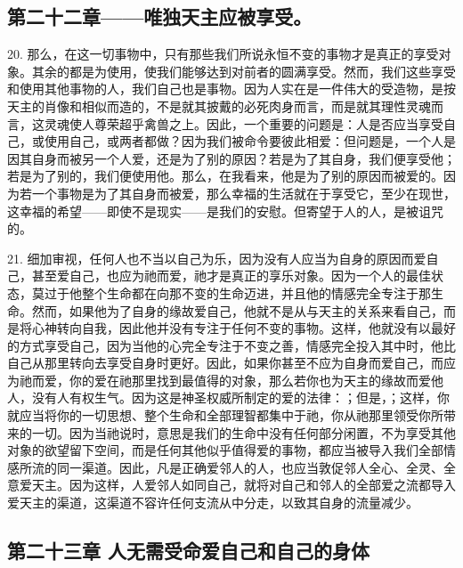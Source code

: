 
\subsection{第二十二章——唯独天主应被享受。}

20. 那么，在这一切事物中，只有那些我们所说永恒不变的事物才是真正的享受对象。其余的都是为使用，使我们能够达到对前者的圆满享受。然而，我们这些享受和使用其他事物的人，我们自己也是事物。因为人实在是一件伟大的受造物，是按天主的肖像和相似而造的，不是就其披戴的必死肉身而言，而是就其理性灵魂而言，这灵魂使人尊荣超乎禽兽之上。因此，一个重要的问题是：人是否应当享受自己，或使用自己，或两者都做？因为我们被命令要彼此相爱：但问题是，一个人是因其自身而被另一个人爱，还是为了别的原因？若是为了其自身，我们便享受他；若是为了别的，我们便使用他。那么，在我看来，他是为了别的原因而被爱的。因为若一个事物是为了其自身而被爱，那么幸福的生活就在于享受它，至少在现世，这幸福的希望——即使不是现实——是我们的安慰。但寄望于人的人，是被诅咒的。\par

21. 细加审视，任何人也不当以自己为乐，因为没有人应当为自身的原因而爱自己，甚至爱自己，也应为祂而爱，祂才是真正的享乐对象。因为一个人的最佳状态，莫过于他整个生命都在向那不变的生命迈进，并且他的情感完全专注于那生命。然而，如果他为了自身的缘故爱自己，他就不是从与天主的关系来看自己，而是将心神转向自我，因此他并没有专注于任何不变的事物。这样，他就没有以最好的方式享受自己，因为当他的心完全专注于不变之善，情感完全投入其中时，他比自己从那里转向去享受自身时更好。因此，如果你甚至不应为自身而爱自己，而应为祂而爱，你的爱在祂那里找到最值得的对象，那么若你也为天主的缘故而爱他人，没有人有权生气。因为这是神圣权威所制定的爱的法律：；但是，；这样，你就应当将你的一切思想、整个生命和全部理智都集中于祂，你从祂那里领受你所带来的一切。因为当祂说时，意思是我们的生命中没有任何部分闲置，不为享受其他对象的欲望留下空间，而是任何其他似乎值得爱的事物，都应当被导入我们全部情感所流的同一渠道。因此，凡是正确爱邻人的人，也应当敦促邻人全心、全灵、全意爱天主。因为这样，人爱邻人如同自己，就将对自己和邻人的全部爱之流都导入爱天主的渠道，这渠道不容许任何支流从中分走，以致其自身的流量减少。\par


\subsection{第二十三章 人无需受命爱自己和自己的身体}

